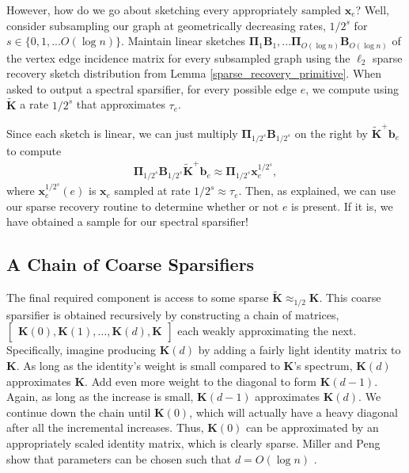\documentclass[11pt]{article}
\newcommand{\bv}[1]{\mathbf{#1}}
\begin{document}
However, how do we go about sketching every appropriately sampled $\bv{x}_e$? Well, consider subsampling our graph at geometrically decreasing rates, $1/2^s$ for $s \in \{0,1,...O(\log n) \}$. Maintain linear sketches $\bv{\Pi}_1 \bv{B}_1,...\bv{\Pi}_{O(\log n)}\bv{B}_{O(\log n)}$ of the vertex edge incidence matrix for every subsampled graph using the $\ell_2$ sparse recovery sketch distribution from Lemma \ref{sparse_recovery_primitive}.
When asked to output a spectral sparsifier, for every possible edge $e$, we compute using $\bv{\tilde K}$ a rate $1/2^s$ that approximates $\tau_e$. 

Since each sketch is linear, 
we can just multiply $\bv{\Pi}_{1/2^s} \bv{B}_{1/2^s}$ on the right by $\bv{\tilde K}^+\bv{b}_e$ to compute
\begin{align*}
\bv{\Pi}_{1/2^s} \bv{B}_{1/2^s}\bv{\tilde K}^+\bv{b}_e \approx \bv{\Pi}_{1/2^s} \bv{x}_e^{1/2^s},
\end{align*}
where $\bv{x}_e^{1/2^s}(e)$ is $\bv{x}_e$ sampled at rate $1/2^s \approx \tau_e$. 
Then, as explained, we can use our sparse recovery routine to determine whether or not $e$ is present. If it is, we have obtained a sample for our spectral sparsifier!

\subsection{A Chain of Coarse Sparsifiers}
The final required component is access to some sparse $\bv{\tilde K} \approx_{1/2} \bv{K}$. This coarse sparsifier is obtained recursively by constructing a chain of matrices, $\begin{bmatrix}\bv{K}(0), \bv{K}(1), \ldots, \bv{K}(d), \bv{K}\end{bmatrix}$ each weakly approximating the next. Specifically, imagine producing $\bv{K}(d)$ by adding a fairly light identity matrix to $\bv{K}$. As long as the identity's weight is small compared to $\bv{K}$'s spectrum, $\bv{K}(d)$ approximates $\bv{K}$. Add even more weight to the diagonal to form $\bv{K}(d-1)$. Again, as long as the increase is small, $\bv{K}(d-1)$ approximates $\bv{K}(d)$. We continue down the chain until $\bv{K}(0)$, which will actually have a heavy diagonal after all the incremental increases. Thus, $\bv{K}(0)$ can be approximated by an appropriately scaled identity matrix, which is clearly sparse. Miller and Peng show that parameters can be chosen such that $d = O(\log n)$ \cite{pengV1}.
\end{document}

